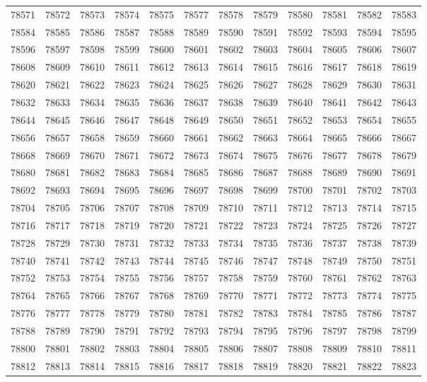\begin{center}
\begin{longtable}{llllllllllll}
78571 &78572 &78573 &78574 &78575 &78577 &78578 &78579 &78580 &78581 &78582 &78583 \\
78584 &78585 &78586 &78587 &78588 &78589 &78590 &78591 &78592 &78593 &78594 &78595 \\
78596 &78597 &78598 &78599 &78600 &78601 &78602 &78603 &78604 &78605 &78606 &78607 \\
78608 &78609 &78610 &78611 &78612 &78613 &78614 &78615 &78616 &78617 &78618 &78619 \\
78620 &78621 &78622 &78623 &78624 &78625 &78626 &78627 &78628 &78629 &78630 &78631 \\
78632 &78633 &78634 &78635 &78636 &78637 &78638 &78639 &78640 &78641 &78642 &78643 \\
78644 &78645 &78646 &78647 &78648 &78649 &78650 &78651 &78652 &78653 &78654 &78655 \\
78656 &78657 &78658 &78659 &78660 &78661 &78662 &78663 &78664 &78665 &78666 &78667 \\
78668 &78669 &78670 &78671 &78672 &78673 &78674 &78675 &78676 &78677 &78678 &78679 \\
78680 &78681 &78682 &78683 &78684 &78685 &78686 &78687 &78688 &78689 &78690 &78691 \\
78692 &78693 &78694 &78695 &78696 &78697 &78698 &78699 &78700 &78701 &78702 &78703 \\
78704 &78705 &78706 &78707 &78708 &78709 &78710 &78711 &78712 &78713 &78714 &78715 \\
78716 &78717 &78718 &78719 &78720 &78721 &78722 &78723 &78724 &78725 &78726 &78727 \\
78728 &78729 &78730 &78731 &78732 &78733 &78734 &78735 &78736 &78737 &78738 &78739 \\
78740 &78741 &78742 &78743 &78744 &78745 &78746 &78747 &78748 &78749 &78750 &78751 \\
78752 &78753 &78754 &78755 &78756 &78757 &78758 &78759 &78760 &78761 &78762 &78763 \\
78764 &78765 &78766 &78767 &78768 &78769 &78770 &78771 &78772 &78773 &78774 &78775 \\
78776 &78777 &78778 &78779 &78780 &78781 &78782 &78783 &78784 &78785 &78786 &78787 \\
78788 &78789 &78790 &78791 &78792 &78793 &78794 &78795 &78796 &78797 &78798 &78799 \\
78800 &78801 &78802 &78803 &78804 &78805 &78806 &78807 &78808 &78809 &78810 &78811 \\
78812 &78813 &78814 &78815 &78816 &78817 &78818 &78819 &78820 &78821 &78822 &78823 \\

\end{longtable}
\end{center}
